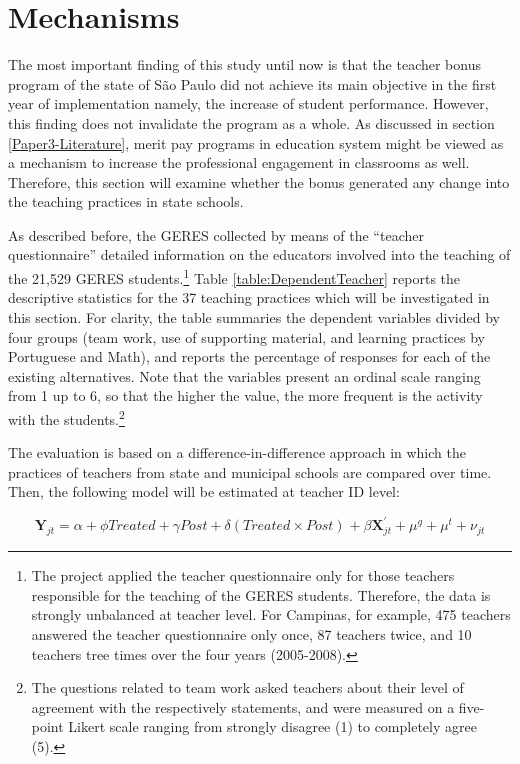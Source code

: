 \documentclass[a4paper, 12pt]{article}
\begin{document}
 
\section{Mechanisms} \label{Paper3-Mechanisms}


The most important finding of this study until now is that the teacher bonus program of the state of São Paulo did not achieve its main objective in the first year of implementation \textemdash namely, the increase of student performance. However, this finding does not invalidate the program as a whole. As discussed in section \ref{Paper3-Literature}, merit pay programs in education system might be viewed as a mechanism to increase the professional engagement in classrooms as well. Therefore, this section will examine whether the bonus generated any change into the teaching practices in state schools.


As described before, the GERES collected by means of the ``teacher questionnaire'' detailed information on the educators involved into the teaching of the 21,529 GERES students.\footnote{The project applied the teacher questionnaire only for those teachers responsible for the teaching of the GERES students. Therefore, the data is strongly unbalanced at teacher level. For Campinas, for example, 475 teachers answered the teacher questionnaire only once, 87 teachers twice, and 10 teachers tree times over the four years (2005-2008).} Table \ref{table:DependentTeacher} reports the descriptive statistics for the 37 teaching practices which will be investigated in this section. For clarity, the table summaries the dependent variables divided by four groups (team work, use of supporting material, and learning practices by Portuguese and Math), and reports the percentage of responses for each of the existing alternatives. Note that the variables present an ordinal scale ranging from 1 up to 6, so that the higher the value, the more frequent is the activity with the students.\footnote{The questions related to team work asked teachers about their level of agreement with the respectively statements, and were measured on a five-point Likert scale ranging from strongly disagree (1) to completely agree (5).}


The evaluation is based on a difference-in-difference approach in which the practices of teachers from state and municipal schools are compared over time. Then, the following model will be estimated at teacher ID level:


\begin{equation} \label{eq:DiD-Teacher}
\mathbf{Y}_{jt} = \alpha + \phi Treated + \gamma Post + \delta (Treated \times Post)_{} + \beta \mathbf{X}_{jt}^{\prime} + \mu^g + \mu^t +  \nu_{jt} 
\end{equation}
\end{document}
